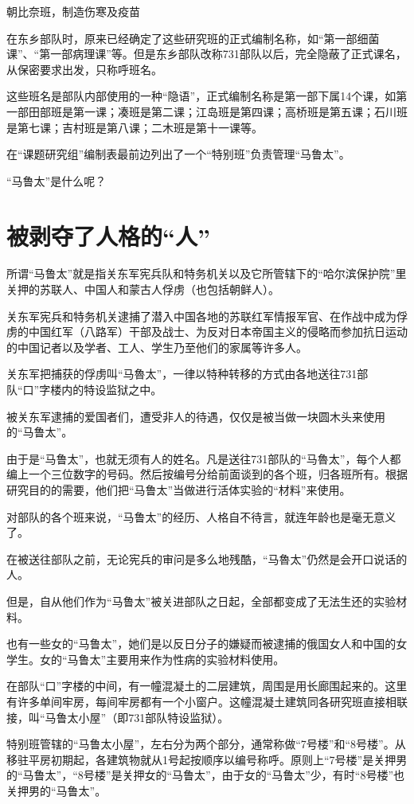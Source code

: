 \documentclass[a4paper,12pt,UTF8,twoside]{ctexbook}
\begin{document}
朝比奈班，制造伤寒及疫苗

在东乡部队时，原来已经确定了这些研究班的正式编制名称，如“第一部细菌课”、“第一部病理课”等。但是东乡部队改称731部队以后，完全隐蔽了正式课名，从保密要求出发，只称呼班名。

这些班名是部队内部使用的一种“隐语”，正式编制名称是第一部下属14个课，如第一部田部班是第一课；凑班是第二课；江岛班是第四课；高桥班是第五课；石川班是第七课；吉村班是第八课；二木班是第十一课等。

在“课题研究组”编制表最前边列出了一个“特别班”负责管理“马鲁太”。

“马鲁太”是什么呢？

\section{被剥夺了人格的“人”}

所谓“马鲁太”就是指关东军宪兵队和特务机关以及它所管辖下的“哈尔滨保护院”里关押的苏联人、中国人和蒙古人俘虏（也包括朝鲜人）。

关东军宪兵和特务机关逮捕了潜入中国各地的苏联红军情报军官、在作战中成为俘虏的中国红军（八路军）干部及战士、为反对日本帝国主义的侵略而参加抗日运动的中国记者以及学者、工人、学生乃至他们的家属等许多人。

关东军把捕获的俘虏叫“马魯太”，一律以特种转移的方式由各地送往731部队“口”字楼内的特设监狱之中。

被关东军逮捕的爱国者们，遭受非人的待遇，仅仅是被当做一块圆木头来使用的“马鲁太”。

由于是“马鲁太”，也就无须有人的姓名。凡是送往731部队的“马魯太”，每个人都编上一个三位数字的号码。然后按编号分给前面谈到的各个班，归各班所有。根据研究目的的需要，他们把“马鲁太”当做进行活体实验的“材料”来使用。

对部队的各个班来说，“马鲁太”的经历、人格自不待言，就连年龄也是毫无意义了。

在被送往部队之前，无论宪兵的审问是多么地残酷，“马魯太”仍然是会开口说话的人。

但是，自从他们作为“马鲁太”被关进部队之日起，全部都变成了无法生还的实验材料。

也有一些女的“马鲁太”，她们是以反日分子的嫌疑而被逮捕的俄国女人和中国的女学生。女的“马鲁太”主要用来作为性病的实验材料使用。

在部队“口”字楼的中间，有一幢混凝土的二层建筑，周围是用长廊围起来的。这里有许多单间牢房，每间牢房都有一个小窗户。这幢混凝土建筑同各研究班直接相联接，叫“马鲁太小屋”（即731部队特设监狱）。

特别班管辖的“马鲁太小屋”，左右分为两个部分，通常称做“7号楼”和“8号楼”。从移驻平房初期起，各建筑物就从1号起按顺序以编号称呼。原则上“7号楼”是关押男的“马鲁太”，“8号楼”是关押女的“马鲁太”，由于女的“马鲁太”少，有时“8号楼”也关押男的“马鲁太”。
\end{document}
